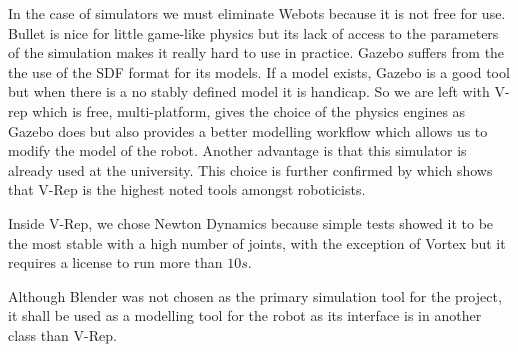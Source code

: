 In the case of simulators we must eliminate Webots because it is not free for use. Bullet is nice for little game-like physics but its lack of access to the parameters of the simulation makes it really hard to use in practice. Gazebo suffers from the the use of the SDF format for its models. If a model exists, Gazebo is a good tool but when there is a no stably defined model it is handicap. So we are left with V-rep which is free, multi-platform, gives the choice of the physics engines as Gazebo does but also provides a better modelling workflow which allows us to modify the model of the robot. Another advantage is that this simulator is already used at the university. This choice is further confirmed by \cite{ivaldi2014tools} which shows that V-Rep is the highest noted tools amongst roboticists.

Inside V-Rep, we chose Newton Dynamics because simple tests showed it to be the most stable with a high number of joints, with the exception of Vortex but it requires a license to run more than $10s$.

Although Blender was not chosen as the primary simulation tool for the project, it shall be used as a modelling tool for the robot as its interface is in another class than V-Rep.